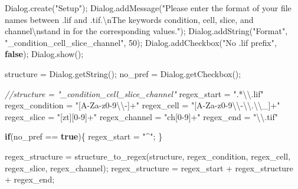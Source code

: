 \documentclass[
  12pt,
  a4paper,
]{book}
\newenvironment{Shaded}{}{}
\newcommand{\CommentTok}[1]{\textcolor[rgb]{0.38,0.63,0.69}{\textit{#1}}}
\newcommand{\ControlFlowTok}[1]{\textcolor[rgb]{0.00,0.44,0.13}{\textbf{#1}}}
\newcommand{\DecValTok}[1]{\textcolor[rgb]{0.25,0.63,0.44}{#1}}
\newcommand{\KeywordTok}[1]{\textcolor[rgb]{0.00,0.44,0.13}{\textbf{#1}}}
\newcommand{\NormalTok}[1]{#1}
\newcommand{\OperatorTok}[1]{\textcolor[rgb]{0.40,0.40,0.40}{#1}}
\newcommand{\SpecialCharTok}[1]{\textcolor[rgb]{0.25,0.44,0.63}{#1}}
\newcommand{\StringTok}[1]{\textcolor[rgb]{0.25,0.44,0.63}{#1}}
\begin{document}
\begin{Shaded}
\begin{Highlighting}[]
\NormalTok{Dialog}\OperatorTok{.}\NormalTok{create}\OperatorTok{(}\StringTok{"Setup"}\OperatorTok{);}
\NormalTok{Dialog}\OperatorTok{.}\NormalTok{addMessage}\OperatorTok{(}\StringTok{"Please enter the format of your file names between \textquotesingle{}.lif\textquotesingle{} and \textquotesingle{}.tif\textquotesingle{}.}\SpecialCharTok{\textbackslash{}n}\StringTok{The keywords \textquotesingle{}condition\textquotesingle{}, \textquotesingle{}cell\textquotesingle{}, \textquotesingle{}slice\textquotesingle{}, and \textquotesingle{}channel\textquotesingle{}}\SpecialCharTok{\textbackslash{}n}\StringTok{stand in for the corresponding values."}\OperatorTok{);}
\NormalTok{Dialog}\OperatorTok{.}\NormalTok{addString}\OperatorTok{(}\StringTok{"Format"}\OperatorTok{,} \StringTok{"\_condition\_cell\_slice\_channel"}\OperatorTok{,} \DecValTok{50}\OperatorTok{);}
\NormalTok{Dialog}\OperatorTok{.}\NormalTok{addCheckbox}\OperatorTok{(}\StringTok{"No .lif prefix"}\OperatorTok{,} \KeywordTok{false}\OperatorTok{);}
\NormalTok{Dialog}\OperatorTok{.}\NormalTok{show}\OperatorTok{();}

\NormalTok{structure }\OperatorTok{=}\NormalTok{ Dialog}\OperatorTok{.}\NormalTok{getString}\OperatorTok{();}
\NormalTok{no\_pref }\OperatorTok{=}\NormalTok{ Dialog}\OperatorTok{.}\NormalTok{getCheckbox}\OperatorTok{();}

\CommentTok{//structure = "\_condition\_cell\_slice\_channel"}
\NormalTok{regex\_start }\OperatorTok{=} \StringTok{".*}\SpecialCharTok{\textbackslash{}\textbackslash{}}\StringTok{.lif"}
\NormalTok{regex\_condition }\OperatorTok{=} \StringTok{"[A{-}Za{-}z0{-}9}\SpecialCharTok{\textbackslash{}\textbackslash{}}\StringTok{{-}]+"}
\NormalTok{regex\_cell }\OperatorTok{=} \StringTok{"[A{-}Za{-}z0{-}9}\SpecialCharTok{\textbackslash{}\textbackslash{}}\StringTok{{-}}\SpecialCharTok{\textbackslash{}\textbackslash{}}\StringTok{.}\SpecialCharTok{\textbackslash{}\textbackslash{}}\StringTok{\_]+"}
\NormalTok{regex\_slice }\OperatorTok{=} \StringTok{"[zt][0{-}9]+"}
\NormalTok{regex\_channel }\OperatorTok{=} \StringTok{"ch[0{-}9]+"}
\NormalTok{regex\_end }\OperatorTok{=} \StringTok{"}\SpecialCharTok{\textbackslash{}\textbackslash{}}\StringTok{.tif"}

\ControlFlowTok{if}\OperatorTok{(}\NormalTok{no\_pref }\OperatorTok{==} \KeywordTok{true}\OperatorTok{)\{}
\NormalTok{    regex\_start }\OperatorTok{=} \StringTok{"\^{}"}\OperatorTok{;}
\OperatorTok{\}}

\NormalTok{regex\_structure }\OperatorTok{=}\NormalTok{ structure\_to\_regex}\OperatorTok{(}\NormalTok{structure}\OperatorTok{,}\NormalTok{ regex\_condition}\OperatorTok{,}\NormalTok{ regex\_cell}\OperatorTok{,}\NormalTok{ regex\_slice}\OperatorTok{,}\NormalTok{ regex\_channel}\OperatorTok{);}
\NormalTok{regex\_structure }\OperatorTok{=}\NormalTok{ regex\_start }\OperatorTok{+}\NormalTok{ regex\_structure }\OperatorTok{+}\NormalTok{ regex\_end}\OperatorTok{;}


\end{Highlighting}
\end{Shaded}
\end{document}
